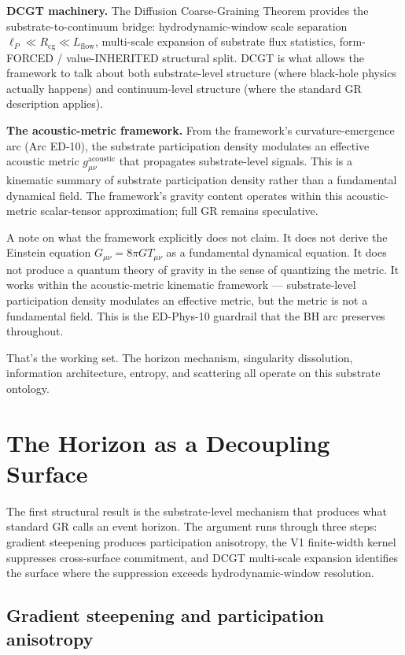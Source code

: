 \documentclass[11pt,a4paper]{article}
\begin{document}
\textbf{DCGT machinery.} The Diffusion Coarse-Graining Theorem provides the substrate-to-continuum bridge: hydrodynamic-window scale separation $\ell_P \ll R_{\mathrm{cg}} \ll L_{\mathrm{flow}}$, multi-scale expansion of substrate flux statistics, form-FORCED / value-INHERITED structural split. DCGT is what allows the framework to talk about both substrate-level structure (where black-hole physics actually happens) and continuum-level structure (where the standard GR description applies).

\textbf{The acoustic-metric framework.} From the framework's curvature-emergence arc (Arc ED-10), the substrate participation density modulates an effective acoustic metric $g_{\mu\nu}^{\mathrm{acoustic}}$ that propagates substrate-level signals. This is a kinematic summary of substrate participation density rather than a fundamental dynamical field. The framework's gravity content operates within this acoustic-metric scalar-tensor approximation; full GR remains speculative.

A note on what the framework explicitly does not claim. It does not derive the Einstein equation $G_{\mu\nu} = 8\pi G T_{\mu\nu}$ as a fundamental dynamical equation. It does not produce a quantum theory of gravity in the sense of quantizing the metric. It works within the acoustic-metric kinematic framework --- substrate-level participation density modulates an effective metric, but the metric is not a fundamental field. This is the ED-Phys-10 guardrail that the BH arc preserves throughout.

That's the working set. The horizon mechanism, singularity dissolution, information architecture, entropy, and scattering all operate on this substrate ontology.

\section{The Horizon as a Decoupling Surface}

The first structural result is the substrate-level mechanism that produces what standard GR calls an event horizon. The argument runs through three steps: gradient steepening produces participation anisotropy, the V1 finite-width kernel suppresses cross-surface commitment, and DCGT multi-scale expansion identifies the surface where the suppression exceeds hydrodynamic-window resolution.

\subsection{Gradient steepening and participation anisotropy}
\end{document}
